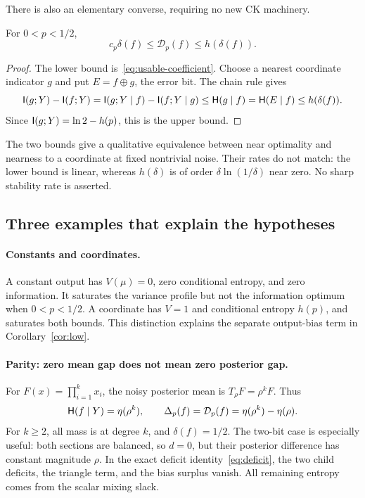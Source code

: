 There is also an elementary converse, requiring no new CK machinery.
\begin{proposition}\label{prop:continuity}
For $0<p<1/2$,
\begin{equation}\label{eq:stability-sandwich}
 c_p\delta(f)\le\mathcal D_p(f)\le h(\delta(f)).
\end{equation}
\end{proposition}
\begin{proof}
The lower bound is~\eqref{eq:usable-coefficient}. Choose a nearest coordinate indicator $g$ and put $E=f\mathbin{\oplus}g$, the error bit. The chain rule gives
\[
 \mathsf I(g;Y)-\mathsf I(f;Y)
 =\mathsf I(g;Y\mid f)-\mathsf I(f;Y\mid g)
 \le\mathsf H(g\mid f)=\mathsf H(E\mid f)\le h(\delta(f)).
\]
Since $\mathsf I(g;Y)=\ln2-h(p)$, this is the upper bound.
\end{proof}
The two bounds give a qualitative equivalence between near optimality and nearness to a coordinate at fixed nontrivial noise. Their rates do not match: the lower bound is linear, whereas $h(\delta)$ is of order $\delta\ln(1/\delta)$ near zero. No sharp stability rate is asserted.

\subsection{Three examples that explain the hypotheses}\label{sec:examples}
\paragraph{Constants and coordinates.}
A constant output has $V(\mu)=0$, zero conditional entropy, and zero information. It saturates the variance profile but not the information optimum when $0<p<1/2$. A coordinate has $V=1$ and conditional entropy $h(p)$, and saturates both bounds. This distinction explains the separate output-bias term in Corollary~\ref{cor:low}.

\paragraph{Parity: zero mean gap does not mean zero posterior gap.}
For $F(x)=\prod_{i=1}^k x_i$, the noisy posterior mean is $T_\rho F=\rho^kF$. Thus
\begin{equation}\label{eq:parity-example}
 \mathsf H(f\mid Y)=\eta(\rho^k),\qquad
 \Delta_p(f)=\mathcal D_p(f)=\eta(\rho^k)-\eta(\rho).
\end{equation}
For $k\ge2$, all mass is at degree $k$, and $\delta(f)=1/2$. The two-bit case is especially useful: both sections are balanced, so $d=0$, but their posterior difference has constant magnitude $\rho$. In the exact deficit identity~\eqref{eq:deficit}, the two child deficits, the triangle term, and the bias surplus vanish. All remaining entropy comes from the scalar mixing slack.

